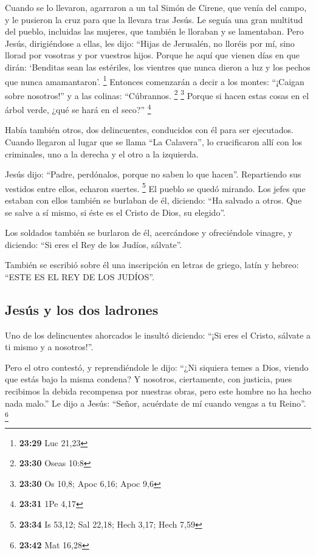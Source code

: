  Cuando se lo llevaron, agarraron a un tal Simón de
Cirene, que venía del campo, y le pusieron la cruz para que la llevara
tras Jesús.  Le seguía una gran multitud del pueblo,
incluidas las mujeres, que también le lloraban y se lamentaban.
 Pero Jesús, dirigiéndose a ellas, les dijo: ``Hijas de
Jerusalén, no lloréis por mí, sino llorad por vosotras y por vuestros
hijos.  Porque he aquí que vienen días en que dirán:
`Benditas sean las estériles, los vientres que nunca dieron a luz y los
pechos que nunca amamantaron'. \footnote{\textbf{23:29} Luc 21,23}
 Entonces comenzarán a decir a los montes: ``¡Caigan
sobre nosotros!'' y a las colinas: ``Cúbrannos. \footnote{\textbf{23:30}
  Oseas 10:8} \footnote{\textbf{23:30} Os 10,8; Apoc 6,16; Apoc 9,6}
 Porque si hacen estas cosas en el árbol verde, ¿qué se
hará en el seco?'' \footnote{\textbf{23:31} 1Pe 4,17}

 Había también otros, dos delincuentes, conducidos con él
para ser ejecutados.  Cuando llegaron al lugar que se
llama ``La Calavera'', lo crucificaron allí con los criminales, uno a la
derecha y el otro a la izquierda.

 Jesús dijo: ``Padre, perdónalos, porque no saben lo que
hacen''. Repartiendo sus vestidos entre ellos, echaron suertes.
\footnote{\textbf{23:34} Is 53,12; Sal 22,18; Hech 3,17; Hech 7,59}
 El pueblo se quedó mirando. Los jefes que estaban con
ellos también se burlaban de él, diciendo: ``Ha salvado a otros. Que se
salve a sí mismo, si éste es el Cristo de Dios, su elegido''.

 Los soldados también se burlaron de él, acercándose y
ofreciéndole vinagre,  y diciendo: ``Si eres el Rey de
los Judíos, sálvate''.

 También se escribió sobre él una inscripción en letras
de griego, latín y hebreo: ``ESTE ES EL REY DE LOS JUDÍOS''.

\hypertarget{jesuxfas-y-los-dos-ladrones}{%
\subsection{Jesús y los dos
ladrones}\label{jesuxfas-y-los-dos-ladrones}}

 Uno de los delincuentes ahorcados le insultó diciendo:
``¡Si eres el Cristo, sálvate a ti mismo y a nosotros!''.

 Pero el otro contestó, y reprendiéndole le dijo: ``¿Ni
siquiera temes a Dios, viendo que estás bajo la misma condena?
 Y nosotros, ciertamente, con justicia, pues recibimos la
debida recompensa por nuestras obras, pero este hombre no ha hecho nada
malo.''  Le dijo a Jesús: ``Señor, acuérdate de mí cuando
vengas a tu Reino''. \footnote{\textbf{23:42} Mat 16,28}

